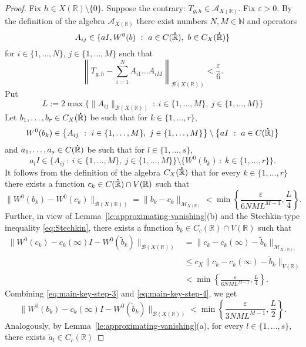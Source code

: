 \documentclass[reqno]{amsproc}
\newcommand{\cA}{\mathcal{A}}
\newcommand{\cB}{\mathcal{B}}
\newcommand{\cM}{\mathcal{M}}
\newcommand{\eps}{\varepsilon}
\newcommand{\dR}{{\bf\dot{\R}}}
\newcommand{\N}{\mathbb{N}}
\newcommand{\R}{\mathbb{R}}
\theoremstyle{definition}
\theoremstyle{remark}
\numberwithin{equation}{section}
\begin{document}
\begin{proof}
Fix $h\in X(\R)\setminus\{0\}$. Suppose the contrary: $T_{g,h}\in\cA_{X(\R)}$.
Fix $\eps>0$. By the definition of the algebra $\cA_{X(\R)}$ there exist
numbers $N,M\in\N$ and operators 
\[
A_{ij}\in\{aI,W^0(b)\ : \ a\in C(\dR),\ b\in C_X(\dR)\}
\]
for $i\in\{1,\dots,N\}$, $j\in\{1,\dots,M\}$ such that
\begin{equation}\label{eq:main-key-step-1}
\left\|
T_{g,h}-\sum_{i=1}^N A_{i1}\dots A_{iM}
\right\|_{\cB(X(\R))}<\frac{\eps}{6}.
\end{equation}
Put
\begin{equation}\label{eq:main-key-step-2}
L:=2\max\big\{
\|A_{ij}\|_{\cB(X(\R))}
\ :\
i\in\{1,\dots,M\},\
j\in\{1,\dots,M\}\big\}
\end{equation}
Let $b_1,\dots,b_r\in C_X(\dR)$ be such that for $k\in\{1,\dots,r\}$,
\[
W^0(b_k)\in
\big\{A_{ij} \ :\
i\in\{1,\dots,M\},\
j\in\{1,\dots,M\}\big\} 
\setminus
\big\{aI\ : \ a\in C(\dR)\big\}
\]
and $a_1,\dots, a_s\in C(\dR)$ be such that for $l\in\{1,\dots,s\}$,
\[
a_lI
\in
\big\{A_{ij} \ :\
i\in\{1,\dots,M\},\
j\in\{1,\dots,M\}\big\} 
\setminus
\big\{W^0(b_k)\ : \ k\in\{1,\dots,r\}\big\}.
\]
It follows from the definition of the algebra $C_X(\dR)$ that for every 
$k\in\{1,\dots,r\}$ there exists a function $c_k\in C(\dR)\cap V(\R)$
such that
\begin{equation}\label{eq:main-key-step-3}
\|W^0(b_k)-W^0(c_k)\|_{\cB(X(\R))}
=
\|b_k-c_k\|_{\cM_{X(\R)}}
<
\min\left\{\frac{\eps}{6NML^{M-1}},\frac{L}{4}\right\}.
\end{equation}
Further, in view of Lemma~\ref{le:approximating-vanishing}(b)
and the Stechkin-type inequality \eqref{eq:Stechkin}, there exists
a function $\widetilde{b}_k\in C_c(\R)\cap V(\R)$ such that
\begin{align}
\|W^0(c_k)-c_k(\infty)I-W^0(\widetilde{b}_k)\|_{\cB(X(\R))}
&=
\|c_k-c_k(\infty)-\widetilde{b}_k\|_{\cM_{X(\R))}}
\nonumber\\
&\le 
c_X\|c_k-c_k(\infty)-\widetilde{b}_k\|_{V(\R)}
\nonumber\\
&<
\min\left\{\frac{\eps}{6NML^{M-1}},\frac{L}{4}\right\}.
\label{eq:main-key-step-4}
\end{align}
Combining \eqref{eq:main-key-step-3} and \eqref{eq:main-key-step-4},
we get
\[
\|W^0(b_k)-c_k(\infty)I-W^0(\widetilde{b}_k)\|_{\cB(X(\R))}
<
\min\left\{\frac{\eps}{3NML^{M-1}},\frac{L}{2}\right\}.
\]
Analogously, by Lemma~\ref{le:approximating-vanishing}(a), for every
$l\in\{1,\dots,s\}$, there exists $\widetilde{a}_l\in C_c(\R)$

\end{proof}
\end{document}
